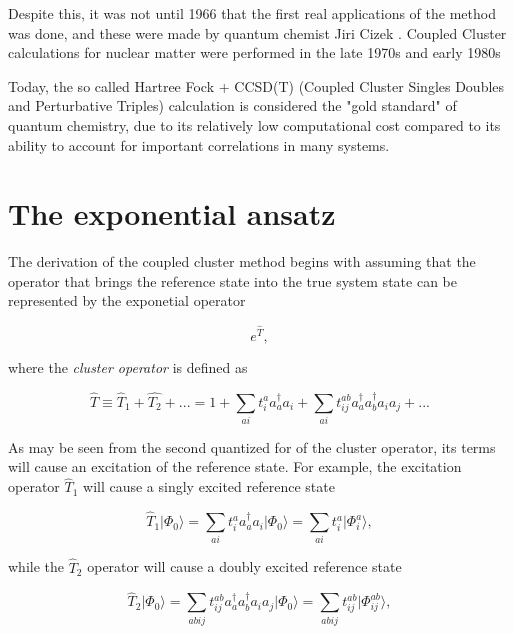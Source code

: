 Despite this, it was not until 1966 that the first real applications of the method was done, and these were made by quantum chemist Jiri Cizek \cite{Cizek1966}. Coupled Cluster calculations for nuclear matter were performed in the late 1970s and early 1980s \cite{kummel1978,day1981}

Today, the so called Hartree Fock + CCSD(T) (Coupled Cluster Singles Doubles and Perturbative Triples) calculation is considered the "gold standard" of quantum chemistry, due to its relatively low computational cost compared to its ability to account for important correlations in many systems. 


\section{The exponential ansatz}
The derivation of the coupled cluster method begins with assuming that the operator that brings the reference state into the true system state can be represented by the exponetial operator

\begin{equation}
e^{\hat{T}} ,
\label{eqn:exponential_ansatz}
\end{equation}

where the \emph{cluster operator} is defined as

\begin{equation}
\hat{T} \equiv  \hat{T}_1 + \hat{T_2} + ... = 1 + \sum_{ai} t_i^a a_{a}^\dagger a_i + \sum_{ai} t_{ij}^{ab} a_{a}^\dagger a_{b}^\dagger a_i a_j + ...
\end{equation}

As may be seen from the second quantized for of the cluster operator, its terms will cause an excitation of the reference state. For example, the excitation operator $\hat{T}_1$ will cause a singly excited reference state

\begin{equation}
\hat{T}_1\vert \Phi_0\rangle = \sum_{ai} t_i^a a_{a}^\dagger a_i|\Phi_0\rangle = \sum_{ai} t_i^a \vert \Phi_i^a\rangle,
\end{equation}

while the $\hat{T}_2$ operator will cause a doubly excited reference state

\begin{equation}
\hat{T}_2 \vert \Phi_0\rangle = \sum_{abij} t_{ij}^{ab} a_{a}^\dagger a_{b}^\dagger a_i a_j|\Phi_0\rangle = \sum_{abij} t_{ij}^{ab} \vert \Phi_{ij}^{ab}\rangle,
\end{equation}


